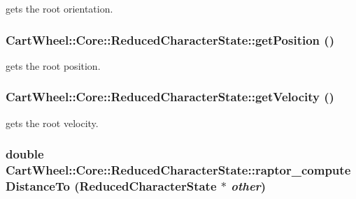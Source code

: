 \label{classCartWheel_1_1Core_1_1ReducedCharacterState_ab4a4505aa8f953f6bdd06cf06546e86f}
gets the root orientation. \hypertarget{classCartWheel_1_1Core_1_1ReducedCharacterState_aba9291acc70e54da9857d8e5b084c45a}{
\subsubsection[{getPosition}]{ CartWheel::Core::ReducedCharacterState::getPosition ()}}
\label{classCartWheel_1_1Core_1_1ReducedCharacterState_aba9291acc70e54da9857d8e5b084c45a}
gets the root position. \hypertarget{classCartWheel_1_1Core_1_1ReducedCharacterState_a5c97fe81fcdd12e1a5a62a23e6b81e35}{
\subsubsection[{getVelocity}]{ CartWheel::Core::ReducedCharacterState::getVelocity ()}}
\label{classCartWheel_1_1Core_1_1ReducedCharacterState_a5c97fe81fcdd12e1a5a62a23e6b81e35}
gets the root velocity. \hypertarget{classCartWheel_1_1Core_1_1ReducedCharacterState_ac18db83455bbd84305928cdf1330ceb1}{
\subsubsection[{raptor\_\-computeDistanceTo}]{\setlength{\rightskip}{0pt plus 5cm}double CartWheel::Core::ReducedCharacterState::raptor\_\-computeDistanceTo ({\bf ReducedCharacterState} $\ast$ {\em other})}}
